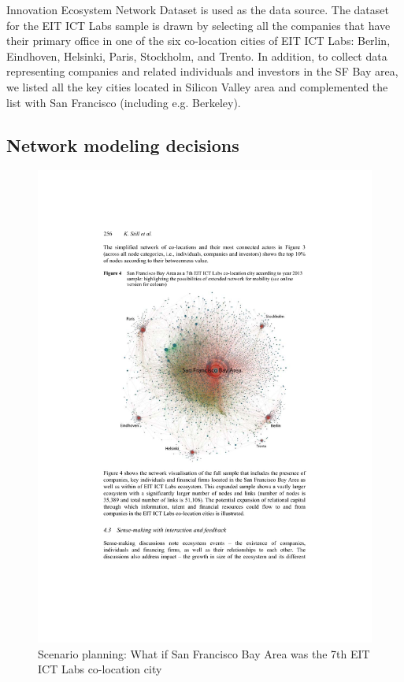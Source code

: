 Innovation Ecosystem Network Dataset \citep{Rubens2010LeveragingMoves} is used as the data source. The dataset for the EIT ICT Labs sample is drawn by selecting all the companies that have their primary office in one of the six co-location cities of EIT ICT Labs: Berlin, Eindhoven, Helsinki, Paris, Stockholm, and Trento. In addition, to collect data representing companies and related individuals and investors in the SF Bay area, we listed all the key cities located in Silicon Valley area and complemented the list with San Francisco (including e.g. Berkeley).

\subsection{Network modeling decisions}

\begin{figure}[htb]
\centering
\includegraphics[]{figure/EIT-ICT-Labs-What-if-SF-Bay.pdf}
\caption{Scenario planning: What if San Francisco Bay Area was the 7th EIT ICT Labs co-location city \citep{Still2014InsightsVisualisations}}
\label{fig:eit-ict-labs-SF-Bay}
\end{figure}

